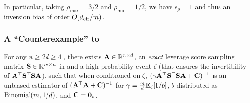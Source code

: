 \documentclass[11pt,a4paper]{article}
\begin{document}
In particular, taking $\rho_{\max} = 3/2$ and $\rho_{\min}=1/2$, we have $\epsilon_{\rho}=1$ and thus an inversion bias of order $O(d_{\mathrm{eff}}/m )$.
\qedwhite

\subsubsection{A ``Counterexample'' to {\citet[Theorem~10]{derezinski2021sparse}}} \label{subsec:exact_lev_zero_bias}
\begin{corollary}\label{coro: exact_lev_zero_bias}
For any $n \geq 2d \geq 4$ , there exists $\mathbf{A}\in {\mathbb{R}}^{n \times d}$, an \emph{exact} leverage score sampling matrix  $\mathbf{S}\in {\mathbb{R}}^{m \times n}$ in  and a high probability event $\zeta$ (that ensures the invertibility of $ \mathbf{A}^\top \mathbf{S}^\top \mathbf{S} \mathbf{A}$), such that when conditioned on $\zeta$, $(\gamma \mathbf{A}^\top \mathbf{S}^\top \mathbf{S} \mathbf{A}+\mathbf{C})^{-1}$ is an unbiased estimator of $(\mathbf{A}^\top \mathbf{A} +\mathbf{C})^{-1}$ for $\gamma=\frac{m}{d}{\mathbb{E}}_{\zeta}[1/b]$, $b$ distributed as ${\rm Binomial}(m, 1/d)$, and $\mathbf{C}=\mathbf{0}_d$.
\end{corollary}
\end{document}
